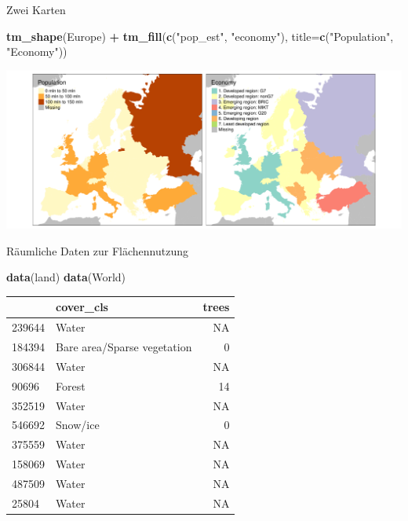 \documentclass[ignorenonframetext,]{beamer}
\newenvironment{Shaded}{\begin{snugshade}}{\end{snugshade}}
\newcommand{\KeywordTok}[1]{\textcolor[rgb]{0.13,0.29,0.53}{\textbf{#1}}}
\newcommand{\DataTypeTok}[1]{\textcolor[rgb]{0.13,0.29,0.53}{#1}}
\newcommand{\StringTok}[1]{\textcolor[rgb]{0.31,0.60,0.02}{#1}}
\newcommand{\OperatorTok}[1]{\textcolor[rgb]{0.81,0.36,0.00}{\textbf{#1}}}
\newcommand{\NormalTok}[1]{#1}
\begin{document}
\begin{frame}[fragile]{Zwei Karten}

\begin{Shaded}
\begin{Highlighting}[]
\KeywordTok{tm_shape}\NormalTok{(Europe) }\OperatorTok{+}
\StringTok{    }\KeywordTok{tm_fill}\NormalTok{(}\KeywordTok{c}\NormalTok{(}\StringTok{"pop_est"}\NormalTok{, }\StringTok{"economy"}\NormalTok{), }
        \DataTypeTok{title=}\KeywordTok{c}\NormalTok{(}\StringTok{"Population"}\NormalTok{, }\StringTok{"Economy"}\NormalTok{))}
\end{Highlighting}
\end{Shaded}

\includegraphics{slides_all2gether_part1_files/figure-beamer/unnamed-chunk-82-1.pdf}

\end{frame}

\begin{frame}[fragile]{Räumliche Daten zur Flächennutzung}

\begin{Shaded}
\begin{Highlighting}[]
\KeywordTok{data}\NormalTok{(land)}
\KeywordTok{data}\NormalTok{(World)}
\end{Highlighting}
\end{Shaded}

\begin{longtable}[]{@{}llr@{}}
\toprule
& cover\_cls & trees\tabularnewline
\midrule
\endhead
239644 & Water & NA\tabularnewline
184394 & Bare area/Sparse vegetation & 0\tabularnewline
306844 & Water & NA\tabularnewline
90696 & Forest & 14\tabularnewline
352519 & Water & NA\tabularnewline
546692 & Snow/ice & 0\tabularnewline
375559 & Water & NA\tabularnewline
158069 & Water & NA\tabularnewline
487509 & Water & NA\tabularnewline
25804 & Water & NA\tabularnewline
\bottomrule
\end{longtable}

\end{frame}
\end{document}
